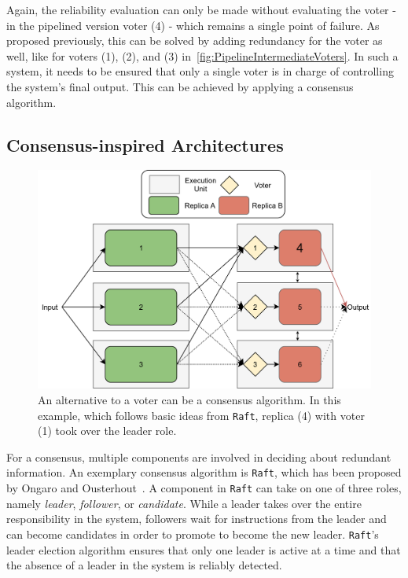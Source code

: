 Again, the reliability evaluation can only be made without evaluating the voter - in the pipelined version voter (4) - which remains a single point of failure.
As proposed previously, this can be solved by adding redundancy for the voter as well, like for voters (1), (2), and (3) in~\autoref{fig:PipelineIntermediateVoters}.
In such a system, it needs to be ensured that only a single voter is in charge of controlling the system's final output.
This can be achieved by applying a consensus algorithm.

\subsection{Consensus-inspired Architectures}
\label{subsec:consensusArchitecture}
\begin{figure}[!hb]
	\centering
	\includegraphics[width=0.75\linewidth]{images/ThreeComponentConsensus}
	\caption{An alternative to a voter can be a consensus algorithm. In this example, which follows basic ideas from \texttt{Raft}, replica (4) with voter (1) took over the leader role.}
	\label{fig:ThreeRepConsensus}
\end{figure}

For a consensus, multiple components are involved in deciding about redundant information.
An exemplary consensus algorithm is \texttt{Raft}, which has been proposed by Ongaro and Ousterhout~\cite{RaftConsensusPaper}.
A component in \texttt{Raft} can take on one of three roles, namely \textit{leader}, \textit{follower}, or \textit{candidate}.
While a leader takes over the entire responsibility in the system, followers wait for instructions from the leader and can become candidates in order to promote to become the new leader.
\texttt{Raft}'s leader election algorithm ensures that only one leader is active at a time and that the absence of a leader in the system is reliably detected.

